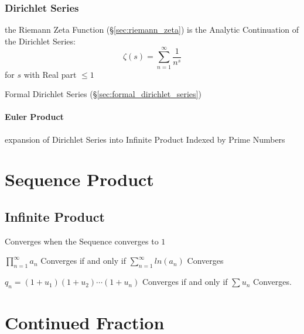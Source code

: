 


\subsubsection{Dirichlet Series}\label{sec:dirichlet_series}

the Riemann Zeta Function (\S\ref{sec:riemann_zeta}) is the Analytic
Continuation of the Dirichlet Series:
\[
  \zeta(s) = \sum_{n=1}^\infty \frac{1}{n^s}
\]
for $s$ with Real part $\leq 1$

\fist Formal Dirichlet Series (\S\ref{sec:formal_dirichlet_series})



\paragraph{Euler Product}\label{sec:euler_product}\hfill

expansion of Dirichlet Series into Infinite Product Indexed by Prime Numbers



\section{Sequence Product}\label{sec:sequence_product}

\subsection{Infinite Product}\label{sec:infinite_product}

Converges when the Sequence converges to $1$

$\prod_{n=1}^\infty a_n$ Converges if and only if $\sum_{n=1}^\infty
ln(a_n)$ Converges

$q_n = (1 + u_1)(1 + u_2)\cdots(1 + u_n)$ Converges if and only if
$\sum u_n$ Converges.



\section{Continued Fraction}\label{sec:continued_fraction}

